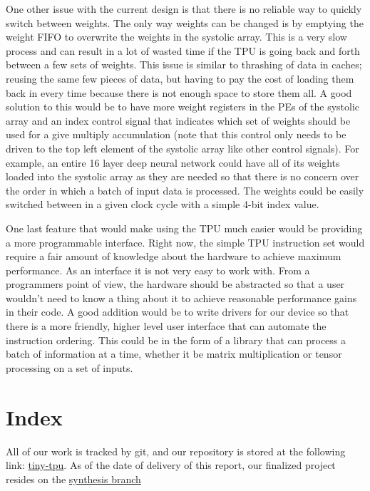 \documentclass[11pt, conference, onecolumn]{IEEEtran}
\begin{document}
    One other issue with the current design is that there is no reliable way to quickly
    switch between weights. The only way weights can be changed is by emptying the weight
    FIFO to overwrite the weights in the systolic array. This is a very slow process and
    can result in a lot of wasted time if the TPU is going back and forth between a few
    sets of weights. This issue is similar to thrashing of data in caches; reusing the
    same few pieces of data, but having to pay the cost of loading them back in every time
    because there is not enough space to store them all. A good solution to this would be
    to have more weight registers in the PEs of the systolic array and an index control
    signal that indicates which set of weights should be used for a give multiply
    accumulation (note that this control only needs to be driven to the top left element
    of the systolic array like other control signals). For example, an entire 16 layer
    deep neural network could have all of its weights loaded into the systolic array as
    they are needed so that there is no concern over the order in which a batch of input
    data is processed. The weights could be easily switched between in a given clock cycle
    with a simple 4-bit index value.

    One last feature that would make using the TPU much easier would be providing a more
    programmable interface. Right now, the simple TPU instruction set would require a fair
    amount of knowledge about the hardware to achieve maximum performance. As an interface
    it is not very easy to work with. From a programmers point of view, the hardware
    should be abstracted so that a user wouldn’t need to know a thing about it to achieve
    reasonable performance gains in their code. A good addition would be to write drivers
    for our device so that there is a more friendly, higher level user interface that can
    automate the instruction ordering. This could be in the form of a library that can
    process a batch of information at a time, whether it be matrix multiplication or
    tensor processing on a set of inputs.

\section{Index}
    All of our work is tracked by git, and our repository is stored at the following link:
    \href{https://github.com/cameronshinn/tiny-tpu}{tiny-tpu}. As of the date of delivery
    of this report, our finalized project resides on the
    \href{https://github.com/cameronshinn/tiny-tpu/tree/synthesis}{synthesis branch}
\end{document}
